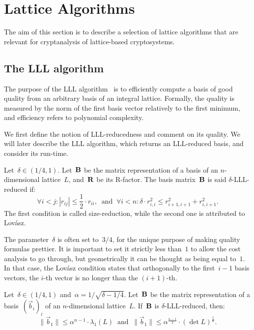\section{Lattice Algorithms}
\label{se:algs}

The aim of this section is to describe a selection of lattice algorithms that are 
relevant for cryptanalysis of lattice-based cryptosystems. 

\subsection{The LLL algorithm} 

The purpose of the LLL algorithm~\cite{LeLeLo82} is to efficiently compute a basis of good quality from an arbitrary basis of an integral lattice. Formally, the quality is measured by the norm of the first  basis vector relatively to the first minimum, and efficiency refers to polynomial complexity. 

We first define the notion of LLL-reducedness and comment on its quality. We will later describe the LLL algorithm, which returns an LLL-reduced basis, and consider its run-time. 

\begin{definition}
\label{def:lll}
Let~$\delta \in (1/4,1)$. 
Let~${\bf B}$ be the matrix representation of a basis of an $n$-dimensional  lattice~$L$, and~${\bf R}$ be its R-factor. 
The basis matrix~${\bf B}$ is said $\delta$-LLL-reduced if:
\[
\forall i<j: |r_{ij}| \leq \frac{1}{2}\cdot  r_{ii}, \ \text{ and } \ \forall i <n: \delta \cdot r_{i,i}^2 \leq  r_{i+1,i+1}^2+r_{i,i+1}^2.   
\]
The first condition is called size-reduction, while the second one is attributed to Lov\'asz. 
\end{definition}

The parameter~$\delta$ is often set to~$3/4$, for the unique purpose of making quality formulas prettier. It is important to set 
it strictly less than~$1$ to allow the cost analysis to go through, but geometrically it can be thought as being equal to~$1$. In that 
case,  the Lov\'asz condition states that orthogonally to the first~$i-1$ basis vectors, the $i$-th vector is no longer than the $(i+1)$-th.

\begin{lemma}
\label{lem:lll}
Let~$\delta \in (1/4,1)$ and~$\alpha = 1/\sqrt{\delta-1/4}$. 
Let~${\bf B}$ be the matrix representation of a basis~$(\vec{b}_i)_i$ of an $n$-dimensional  lattice~$L$. If~${\bf B}$ is $\delta$-LLL-reduced, then: 
\[
\|\vec{b}_1\| \leq \alpha^{n-1} \cdot \lambda_1(L) \ \mbox{ and } \ \|\vec{b}_1\| \leq \alpha^{\frac{n-1}{2}} \cdot (\det L)^{\frac{1}{n}} .   
\]
\end{lemma}

